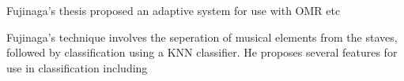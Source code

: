 \section {\cite{fujinaga1996adaptive}}

Fujinaga's thesis proposed an adaptive system for use with OMR etc

Fujinaga's technique involves the seperation of musical elements from the staves, followed by
classification using a \acrfull{KNN} classifier. He proposes several features for use in classification including 
